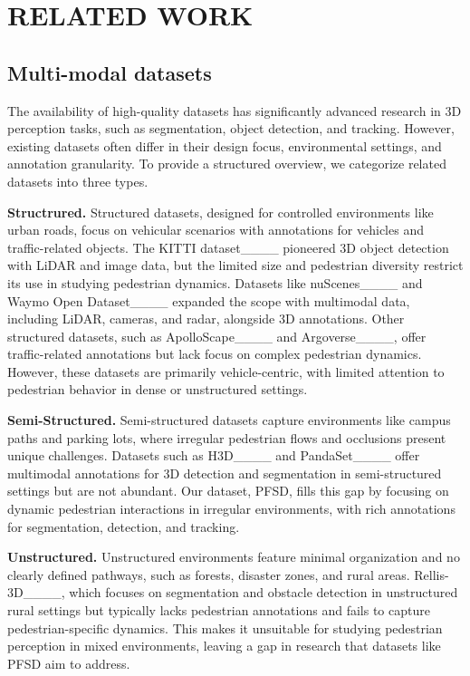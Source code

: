 \section{RELATED WORK}
\subsection{Multi-modal datasets}
The availability of high-quality datasets has significantly advanced research in 3D perception tasks, such as segmentation, object detection, and tracking. However, existing datasets often differ in their design focus, environmental settings, and annotation granularity. To provide a structured overview, we categorize related datasets into three types.

\textbf{Structrured.} Structured datasets, designed for controlled environments like urban roads, focus on vehicular scenarios with annotations for vehicles and traffic-related objects. The KITTI dataset____ pioneered 3D object detection with LiDAR and image data, but the limited size and pedestrian diversity restrict its use in studying pedestrian dynamics. Datasets like nuScenes____ and Waymo Open Dataset____ expanded the scope with multimodal data, including LiDAR, cameras, and radar, alongside 3D annotations. Other structured datasets, such as ApolloScape____ and Argoverse____, offer traffic-related annotations but lack focus on complex pedestrian dynamics. However, these datasets are primarily vehicle-centric, with limited attention to pedestrian behavior in dense or unstructured settings.

\textbf{Semi-Structured.} Semi-structured datasets capture environments like campus paths and parking lots, where irregular pedestrian flows and occlusions present unique challenges. Datasets such as H3D____ and PandaSet____ offer multimodal annotations for 3D detection and segmentation in semi-structured settings but are not abundant. Our dataset, PFSD, fills this gap by focusing on dynamic pedestrian interactions in irregular environments, with rich annotations for segmentation, detection, and tracking.

\textbf{Unstructured.} Unstructured environments feature minimal organization and no clearly defined pathways, such as forests, disaster zones, and rural areas. Rellis-3D____, which focuses on segmentation and obstacle detection in unstructured rural settings but typically lacks pedestrian annotations and fails to capture pedestrian-specific dynamics. This makes it unsuitable for studying pedestrian perception in mixed environments, leaving a gap in research that datasets like PFSD aim to address.


